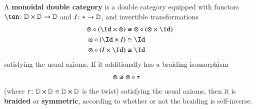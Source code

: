 \begin{defn}\label{def:symmondoub}
  A \textbf{monoidal double category} is a double category equipped
  with functors $\ten\maps \lD\times\lD\to\lD$ and $I\colon * \to\mathbb{D}$,
  and invertible transformations
  \begin{align*}
    \mathord{\otimes} \circ (\Id\times \mathord{\otimes})
    &\iso \mathord{\otimes} \circ (\mathord{\otimes} \times \Id)\\
    \mathord{\otimes} \circ (\Id\times I) &\iso \Id\\
    \mathord{\otimes} \circ (I\times \Id) &\iso \Id
  \end{align*}
  satisfying the usual axioms.  If it additionally has a braiding
  isomorphism
  \begin{align*}
    \mathord{\otimes} &\cong \mathord{\otimes} \circ \tau
  \end{align*}
  (where $\tau\colon \mathbb{D}\times\mathbb{D}\cong \mathbb{D}\times\mathbb{D}$ is the twist)
  satisfying the usual axioms, then it is \textbf{braided} or
  \textbf{symmetric}, according to whether or not the braiding is
  self-inverse.
\end{defn}

